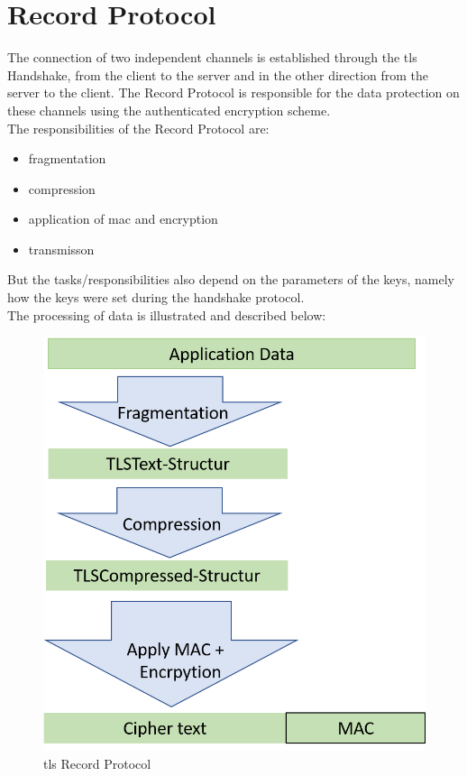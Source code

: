 \section{Record Protocol}
\label{sec:record_protocol}

The connection of two independent channels is established through the \gls{tls} Handshake, from the client to the server and in the other direction from the server to the client. The Record Protocol is responsible for the data protection on these channels using the authenticated encryption scheme.\\
The responsibilities of the Record Protocol are:
\begin{itemize}
	\item fragmentation
	\item compression
	\item application of \gls{mac} and encryption
	\item transmisson 
\end{itemize}
But the tasks/responsibilities also depend on the parameters of the keys, namely how the keys were set during the handshake protocol. \\
The processing of data is illustrated and described below:      

\begin{figure}[H]
	\centering
		\includegraphics[scale=0.5]{images/tls_recordprotocol.png}
	\caption{\gls{tls} Record Protocol}
	\label{fig:tls_recordprotocol}
\end{figure}

